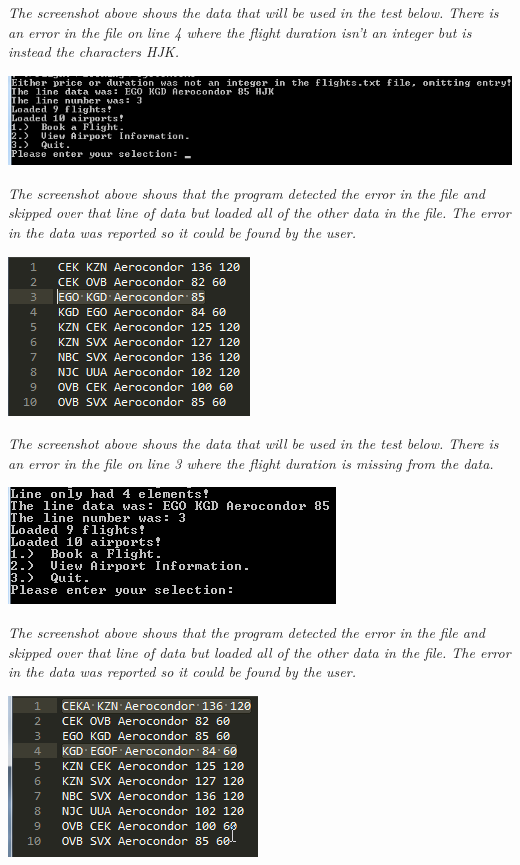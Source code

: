 \documentclass[10pt, a4paper]{article}
\begin{document}
\textit{The screenshot above shows the data that will be used in the test below. There is an error in the file on line 4 where the flight duration isn't an integer but is instead the characters HJK.}

\includegraphics[scale=0.85]{DataValidation4.png}

\textit{The screenshot above shows that the program detected the error in the file and skipped over that line of data but loaded all of the other data in the file. The error in the data was reported so it could be found by the user.}

\includegraphics{Data5.png}

\textit{The screenshot above shows the data that will be used in the test below. There is an error in the file on line 3 where the flight duration is missing from the data.}

\includegraphics{DataValidation5.png}

\textit{The screenshot above shows that the program detected the error in the file and skipped over that line of data but loaded all of the other data in the file. The error in the data was reported so it could be found by the user.}

\newpage

\includegraphics{Data6.png}
\end{document}
